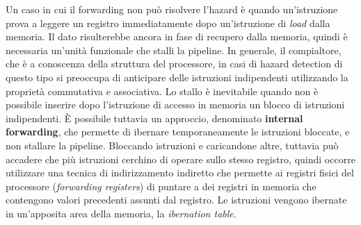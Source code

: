 \noindent Un caso in cui il forwarding non può risolvere l'hazard è quando un'istruzione prova a leggere un registro immediatamente dopo un'istruzione di \textit{load} dalla memoria. Il dato risulterebbe ancora in fase di recupero dalla memoria, quindi è necessaria un'unità funzionale che stalli la pipeline. In generale, il compialtore, che è a conoscenza della struttura del processore, in casi di hazard detection di questo tipo si preoccupa di anticipare delle istruzioni indipendenti utilizzando la proprietà commutativa e associativa. Lo stallo è inevitabile quando non è possibile inserire dopo l'istruzione di accesso in memoria un blocco di istruzioni indipendenti. \uppercase{è} possibile tuttavia un approccio, denominato \textbf{internal forwarding}, che permette di ibernare temporaneamente le istruzioni bloccate, e non stallare la pipeline. Bloccando istruzioni e caricandone altre, tuttavia può accadere che più istruzioni cerchino di operare sullo stesso registro, quindi occorre utilizzare una tecnica di indirizzamento indiretto che permette ai registri fisici del processore (\textit{forwarding registers}) di puntare a dei registri in memoria che contengono valori precedenti assunti dal registro. Le istruzioni vengono ibernate in un'apposita area della memoria, la \textit{ibernation table}. 

